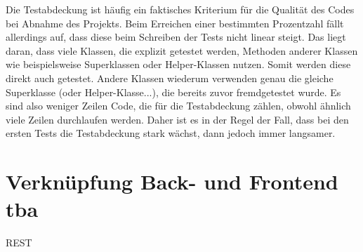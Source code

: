 	Die Testabdeckung ist häufig ein faktisches Kriterium für die Qualität des Codes bei Abnahme des Projekts. Beim Erreichen einer bestimmten Prozentzahl fällt allerdings auf, dass diese beim Schreiben der Tests nicht linear steigt. Das liegt daran, dass viele Klassen, die explizit getestet werden, Methoden anderer Klassen wie beispielsweise Superklassen oder Helper-Klassen nutzen. Somit werden diese direkt auch getestet. Andere Klassen wiederum verwenden genau die gleiche Superklasse (oder Helper-Klasse...), die bereits zuvor fremdgetestet wurde. Es sind also weniger Zeilen Code, die für die Testabdeckung zählen, obwohl ähnlich viele Zeilen durchlaufen werden. Daher ist es in der Regel der Fall, dass bei den ersten Tests die Testabdeckung stark wächst, dann jedoch immer langsamer.
	
	\section[Verknüpfung Back- und Frontend]{Verknüpfung Back- und Frontend {\hfill \normalsize tba}}
	REST
	
